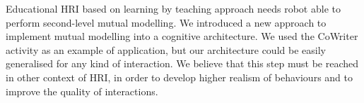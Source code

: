 \documentclass[conference]{IEEEtran}
\begin{document}
Educational HRI based on learning by teaching approach needs robot able to perform second-level mutual modelling. 
We introduced a new approach to implement mutual modelling into a cognitive architecture. We used the CoWriter activity
as an example of application, but our architecture could be easily generalised for any kind of interaction.
We believe that this step must be reached in other context of HRI, in order to develop higher realism of behaviours
and to improve the quality of interactions. 

%
%
%
%
%
%
\end{document}

